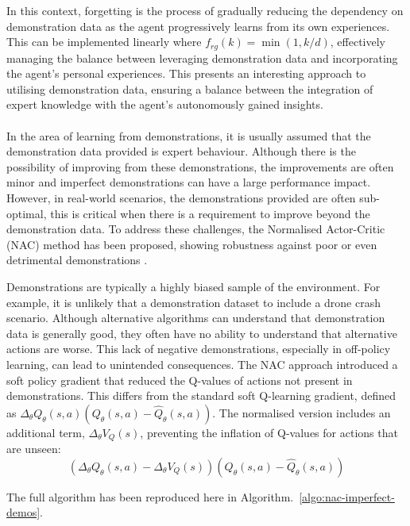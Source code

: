 In this context, forgetting is the process of gradually reducing the dependency on demonstration data as the agent progressively learns from its own experiences.
This can be implemented linearly where $f_{rg}(k) = \min(1, k/d)$, effectively managing the balance between leveraging demonstration data and incorporating the agent's personal experiences.
This presents an interesting approach to utilising demonstration data, ensuring a balance between the integration of expert knowledge with the agent's autonomously gained insights. \\\\

In the area of learning from demonstrations, it is usually assumed that the demonstration data provided is expert behaviour.
Although there is the possibility of improving from these demonstrations, the improvements are often minor and imperfect demonstrations can have a large performance impact.
However, in real-world scenarios, the demonstrations provided are often sub-optimal, this is critical when there is a requirement to improve beyond the demonstration data.
To address these challenges, the Normalised Actor-Critic (NAC) method has been proposed, showing robustness against poor or even detrimental demonstrations \cite{fyp14-rl-imperfect-demos}.

Demonstrations are typically a highly biased sample of the environment.
For example, it is unlikely that a demonstration dataset to include a drone crash scenario.
Although alternative algorithms can understand that demonstration data is generally good, they often have no ability to understand that alternative actions are worse.
This lack of negative demonstrations, especially in off-policy learning, can lead to unintended consequences.
The NAC approach introduced a soft policy gradient that reduced the Q-values of actions not present in demonstrations.
This differs from the standard soft Q-learning gradient, defined as $ \Delta_{\theta} Q_{\theta}(s, a)(Q_{\theta}(s, a) - \hat{Q}_{\theta}(s, a)) $.
The normalised version includes an additional term, $\Delta_{\theta} V_Q(s)$, preventing the inflation of Q-values for actions that are unseen:
\[ (\Delta_{\theta} Q_{\theta}(s, a) - \Delta_{\theta} V_Q(s))(Q_{\theta}(s, a) - \hat{Q}_{\theta}(s, a))\]

The full algorithm has been reproduced here in Algorithm.~\ref{algo:nac-imperfect-demos}.

